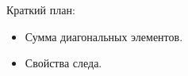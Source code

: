 
\begin{frame} %


\end{frame}



\begin{frame}{Краткий план:}
  \begin{itemize}[<+->] 
    \item Сумма диагональных элементов.
    \item Свойства следа.
  \end{itemize}

\end{frame}






        




